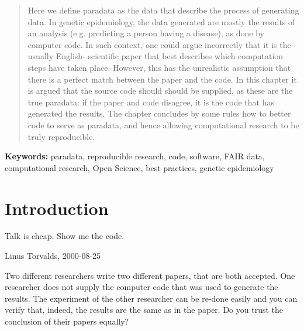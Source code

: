 \begin{abstract}

Here we define paradata as the data that describe the process of generating data.
In genetic epidemiology, the data generated are mostly the results 
of an analysis (e.g. predicting a person having a disease),
as done by computer code.
In such context, one could argue incorrectly that
it is the -usually English- scientific paper that best describes which computation steps 
have taken place.
However, this has the unrealistic 
assumption that there is a perfect match between the paper and the code.
In this chapter it is argued that the source code should should be supplied,
as these are the true paradata: if the paper and code disagree, it is the
code that has generated the results.
The chapter concludes by some rules how to better code to serve as paradata,
and hence allowing computational research to be truly reproducible.

\end{abstract}

{\bf Keywords:} paradata, reproducible research, code, software,
FAIR data, computational research, Open Science, best practices,
genetic epidemiology

\section{Introduction}

\epigraph{
  Talk is cheap. Show me the code.
}{
  Linus Torvalds, 2000-08-25
}



Two different researchers write two different papers,
that are both accepted. One researcher does not supply the
computer code that was used to generate the results.
The experiment of the other researcher can be re-done easily
and you can verify that, indeed, the results are the same
as in the paper.
Do you trust the conclusion of their papers equally?

